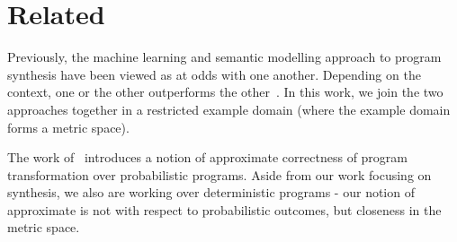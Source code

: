 

\section{Related}

Previously, the machine learning and semantic modelling approach to program synthesis have been viewed as at odds with one another.
Depending on the context, one or the other outperforms the other~\cite{devlin2017robustfill}.
In this work, we join the two approaches together in a restricted example domain (where the example domain forms a metric space).

The work of~\cite{misailovic2011probabilistically} introduces a notion of approximate correctness of program transformation over probabilistic programs.
Aside from our work focusing on synthesis, we also are working over deterministic programs - our notion of approximate is not with respect to probabilistic outcomes, but closeness in the metric space.


